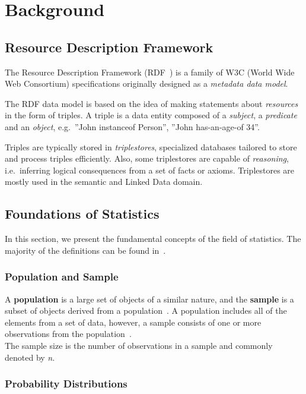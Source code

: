 
\chapter{Background}\label{chapter:background}

\section{Resource Description Framework}

The Resource Description Framework (RDF~\cite{RDF}) is a family of W3C (World Wide Web Consortium) specifications originally designed as a \emph{metadata data model}. 

The RDF data model is based on the idea of making statements about \emph{resources} in the form of triples. A triple is a data entity composed of a \emph{subject}, a \emph{predicate} and an \emph{object}, e.g.\ ''John instanceof Person'', ''John \mbox{has-an-age-of} 34''.  

Triples are typically stored in \emph{triplestores}, specialized databases tailored to store and process triples efficiently. Also, some triplestores are capable of \emph{reasoning}, i.e.\ inferring logical consequences from a set of facts or axioms. Triplestores are mostly used in the semantic and Linked Data domain.

\section{Foundations of Statistics} \label{section:distributions}
In this section, we present the fundamental concepts of the field of statistics. The majority of the definitions can be found in~\cite{statistics_book}.

\subsection{Population and Sample}

A \textbf{population} is a large set of objects of a similar nature, and the \textbf{sample} is a subset of objects derived from a population~\cite{sample1}. A population includes all of the elements from a set of data, however, a sample consists of one or more observations from the population~\cite{sample2}.\\
The sample size is the number of observations in a sample and commonly denoted by \textit{n}.

\subsection{Probability Distributions}

